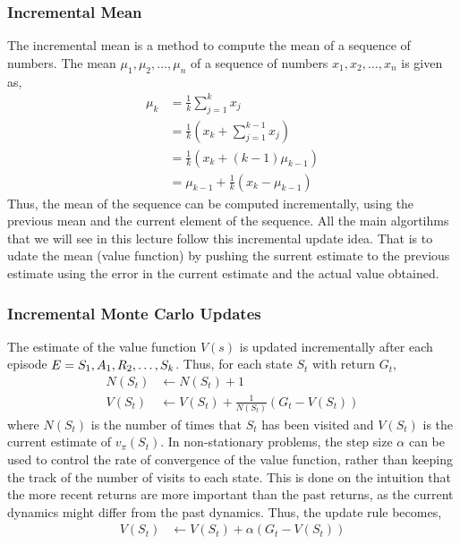 \subsubsection*{Incremental Mean}
The incremental mean is a method to compute the mean of a sequence of numbers.
The mean \(\mu_1, \mu_2, \dots, \mu_n\) of a sequence of numbers \(x_1, x_2, \dots, x_n\)
is given as,
\[
    \begin{aligned}
        \mu_k &= \frac{1}{k}\sum_{j=1}^{k}x_j \\
        &= \frac{1}{k}(x_k + \sum_{j=1}^{k-1}x_j) \\
        &= \frac{1}{k}(x_k + (k-1)\mu_{k-1}) \\
        &= \mu_{k-1} + \frac{1}{k}(x_k - \mu_{k-1})      
    \end{aligned}
\] 
Thus, the mean of the sequence can be computed incrementally, using the previous
mean and the current element of the sequence. All the main algortihms that we will see in
this lecture follow this incremental update idea. That is to udate the mean (value function)
by pushing the surrent estimate to the previous estimate using the error in the current
estimate and the actual value obtained.

\subsubsection{Incremental Monte Carlo Updates}
The estimate of the value function \(V(s)\) is updated incrementally after each episode
\(E = S_1, A_1, \\R_2, \dots, S_k\). Thus, for each state \(S_t\) with return \(G_t\),
\[
    \begin{aligned}
        N(S_t) &\leftarrow N(S_t) + 1 \\
        V(S_t) &\leftarrow V(S_t) + \frac{1}{N(S_t)}\left( 
            G_t - V(S_t)
         \right) 
    \end{aligned}
\]
where \(N(S_t)\) is the number of times that \(S_t\) has been visited and \(V(S_t)\)
is the current estimate of \(v_{\pi}(S_t)\). In non-stationary problems, the step size
\(\alpha\) can be used to control the rate of convergence of the value function, rather
than keeping the track of the number of visits to each state. This is done on the intuition
that the more recent returns are more important than the past returns, as the current
dynamics might differ from the past dynamics.
Thus, the update rule becomes,
\[
    \begin{aligned}
        V(S_t) &\leftarrow V(S_t) + \alpha\left( 
            G_t - V(S_t)
         \right) 
    \end{aligned}
\]

